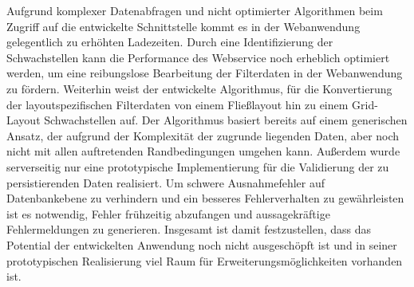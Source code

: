 Aufgrund komplexer Datenabfragen und nicht optimierter Algorithmen beim Zugriff auf die entwickelte Schnittstelle kommt es in der Webanwendung gelegentlich zu erhöhten Ladezeiten. Durch eine Identifizierung der Schwachstellen kann die Performance des Webservice noch erheblich optimiert werden, um eine reibungslose Bearbeitung der Filterdaten in der Webanwendung zu fördern. Weiterhin weist der entwickelte Algorithmus, für die Konvertierung der layoutspezifischen Filterdaten von einem Fließlayout hin zu einem Grid-Layout Schwachstellen auf. Der Algorithmus basiert bereits auf einem generischen Ansatz, der aufgrund der Komplexität der zugrunde liegenden Daten, aber noch nicht mit allen auftretenden Randbedingungen umgehen kann. Außerdem wurde serverseitig nur eine prototypische Implementierung für die Validierung der zu persistierenden Daten realisiert. Um schwere Ausnahmefehler auf Datenbankebene zu verhindern und ein besseres Fehlerverhalten zu gewährleisten ist es notwendig, Fehler frühzeitig abzufangen und aussagekräftige Fehlermeldungen zu generieren. Insgesamt ist damit festzustellen, dass das Potential der entwickelten Anwendung noch nicht ausgeschöpft ist und in seiner prototypischen Realisierung viel Raum für Erweiterungsmöglichkeiten vorhanden ist.